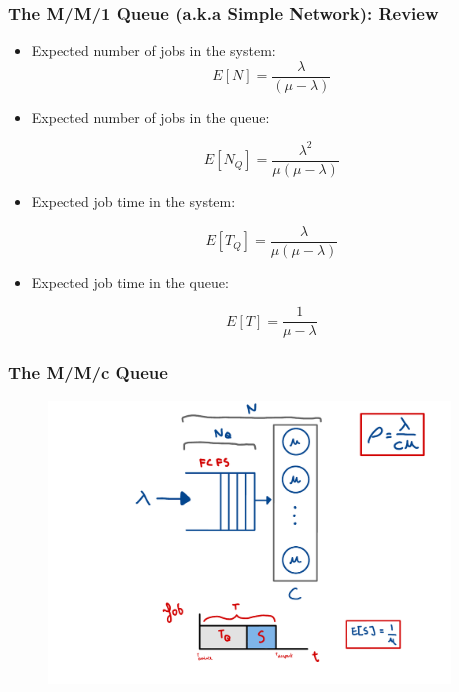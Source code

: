 \begin{frame}
    \frametitle{The M/M/1 Queue (a.k.a Simple Network): Review}
    \begin{itemize}


        \item Expected number of jobs in the system:
        $$E[N] = \frac{\lambda}{(\mu - \lambda)}$$

        \item Expected number of jobs in the queue:

        $$E[N_Q] = \frac{\lambda^2}{\mu(\mu-\lambda)}$$

        \item Expected job time in the system:

        $$E[T_Q] = \frac{\lambda}{\mu(\mu-\lambda)}$$

        \item Expected job time in the queue:

        $$E[T] = \frac{1}{\mu-\lambda}$$
    \end{itemize}
\end{frame}

\begin{frame}
    \frametitle{The M/M/c Queue}
    \begin{figure}
        \centering
        \includegraphics[width=0.95\textwidth]{slides/figures/mmc_queue.pdf}
    \end{figure}
\end{frame}

